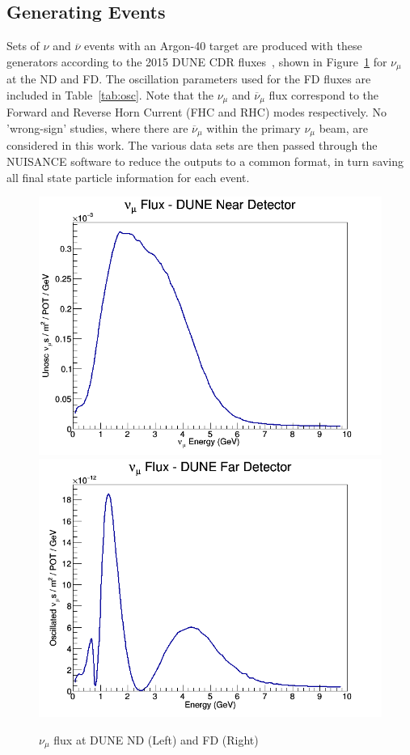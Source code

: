 \documentclass[12pt]{article}
\begin{document}
\subsection{Generating Events}
\label{subsec:events}
Sets of $\nu$ and $\overline{\nu}$ events with an Argon-40 target are produced with these generators according to the 2015 DUNE CDR fluxes~\cite{DUNE_osc}, shown in Figure~\ref{fig:dune_flux} for $\nu_{\mu}$ at the ND and FD. The oscillation parameters used for the FD fluxes are included in Table~\ref{tab:osc}. Note that the $\nu_\mu$ and $\overline{\nu}_\mu$ flux correspond to the Forward and Reverse Horn Current (FHC and RHC) modes respectively. No 'wrong-sign' studies, where there are $\overline{\nu}_\mu$ within the primary $\nu_\mu$ beam, are considered in this work. The various data sets are then passed through the NUISANCE\cite{NUISANCE} software to reduce the outputs to a common format, in turn saving all final state particle information for each event. 
\begin{figure}[h]
\centering
{}
\includegraphics[width=\linewidth]{Dune_Flux/numu_ND_flux.png}
\endminipage
{}
\includegraphics[width=\linewidth]{Dune_Flux/numu_FD_flux.png}
\endminipage
\caption{$\nu_\mu$ flux at DUNE ND (Left) and FD (Right)}
\label{fig:dune_flux}
\end{figure}
\end{document}
